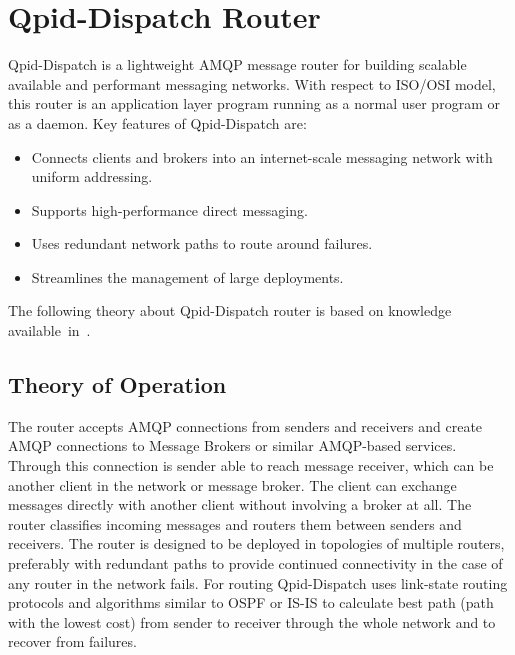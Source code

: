 \section{Qpid-Dispatch Router}
Qpid-Dispatch is a lightweight AMQP message router for building scalable available and performant messaging networks. With respect to ISO/OSI\footnotemark{} model, this router is an application layer program running as a normal user program or as a daemon. Key features of Qpid-Dispatch are:

\begin{itemize}
	\setlength\itemsep{0em}
	\item Connects clients and brokers into an internet-scale messaging network with uniform addressing.
	\item Supports high-performance direct messaging.
	\item Uses redundant network paths to route around failures.
	\item Streamlines the management of large deployments.
\end{itemize}
The following theory about Qpid-Dispatch router is based on knowledge available~in~\cite{RH:Interconnect}.


\subsection{Theory of Operation}
The router accepts AMQP connections from senders and receivers and create AMQP connections to Message Brokers or similar AMQP-based services. Through this connection is sender able to reach message receiver, which can be another client in the network or message broker. The client can exchange messages directly with another client without involving a broker at all. The router classifies incoming messages and routers them between senders and receivers. The router is designed to be deployed in topologies of multiple routers, preferably with redundant paths to provide continued connectivity in the case of any router in the network fails. For routing Qpid-Dispatch uses link-state routing protocols\footnotemark{} and algorithms similar to OSPF or IS-IS to calculate best path (path with the lowest cost) from sender to receiver through the whole network and to recover from failures. 


